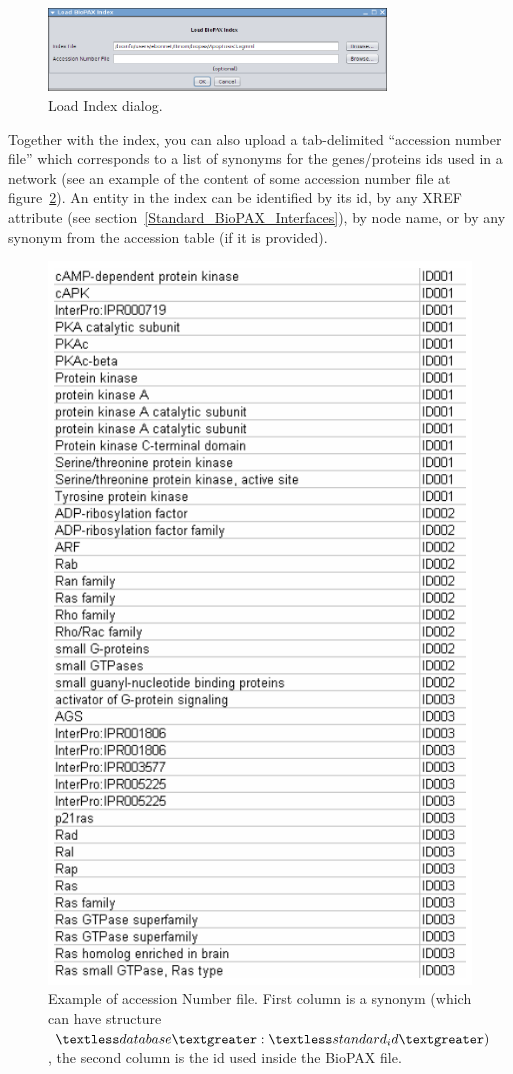\begin{figure}
\centering
\includegraphics[width=0.8\textwidth]{graphics/ebo_load_BioPAX_Index}
\caption{Load Index dialog.}
\label{Load_Index_Dialog}
\end{figure}

Together with the index, you can also upload a tab-delimited “accession number
file” which corresponds to a list of synonyms for the genes/proteins ids used in
a network (see an example of the content of some accession number file at
figure~\ref{Accession_Number_File}). An entity in the index can be identified by
its id, by any XREF attribute (see section~\ref{Standard_BioPAX_Interfaces}), by
node name, or by any synonym from the accession table (if it is provided).

\begin{figure}
\centering
\includegraphics[width=8 cm]{graphics/Accession_Number_File}
\caption{Example of accession Number file. First column is a synonym (which can have structure $\textless database\textgreater :\textless standard_id\textgreater)$, the second column is the id used inside the BioPAX file.}
\label{Accession_Number_File}
\end{figure}

